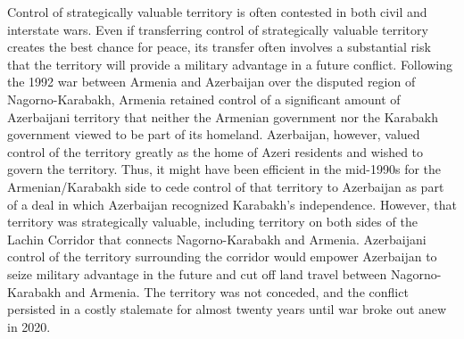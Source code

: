 \documentclass[bibtex,autowc]{apsr_submission}
\begin{document}

Control of strategically valuable territory is often contested in both civil and interstate wars. Even if transferring control of strategically valuable territory creates the best chance for peace, its transfer often involves a substantial risk that the territory will provide a military advantage in a future conflict. Following the 1992 war between Armenia and Azerbaijan over the disputed region of Nagorno-Karabakh, Armenia retained control of a significant amount of Azerbaijani territory that neither the Armenian government nor the Karabakh government viewed to be part of its homeland. Azerbaijan, however, valued control of the territory greatly as the home of Azeri residents and wished to govern the territory. Thus, it might have been efficient in the mid-1990s for the Armenian/Karabakh side to cede control of that territory to Azerbaijan as part of a deal in which Azerbaijan recognized Karabakh's independence. However, that territory was strategically valuable, including territory on both sides of the Lachin Corridor that connects Nagorno-Karabakh and Armenia. Azerbaijani control of the territory surrounding the corridor would empower Azerbaijan to seize military advantage in the future and cut off land travel between Nagorno-Karabakh and Armenia. The territory was not conceded, and the conflict persisted in a costly stalemate for almost twenty years until war broke out anew in 2020. 
\end{document}
